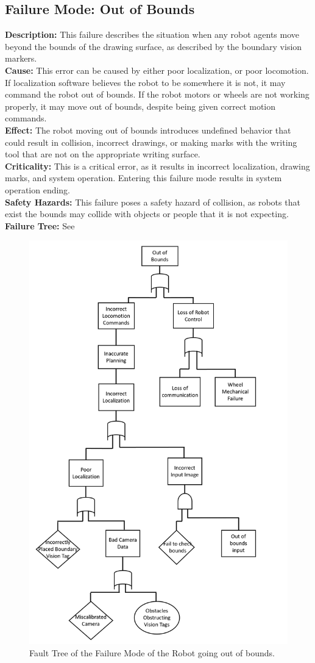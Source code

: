 \subsection{Failure Mode: Out of Bounds}
\label{sec:sys_val_fm_bounds}
\textbf{Description:} This failure describes the situation when any robot agents move beyond the bounds of the drawing surface, as described by the boundary vision markers.\\
\textbf{Cause:} This error can be caused by either poor localization, or poor locomotion. If localization software believes the robot to be somewhere it is not, it may command the robot out of bounds. If the robot motors or wheels are not working properly, it may move out of bounds, despite being given correct motion commands.\\
\textbf{Effect:} The robot moving out of bounds introduces undefined behavior that could result in collision, incorrect drawings, or making marks with the writing tool that are not on the appropriate writing surface.\\
\textbf{Criticality:} This is a critical error, as it results in incorrect localization, drawing marks, and system operation. Entering this failure mode results in system operation ending.\\
\textbf{Safety Hazards:} This failure poses a safety hazard of collision, as robots that exist the bounds may collide with objects or people that it is not expecting.\\
\textbf{Failure Tree:} See 

\begin{figure}
 \centering
 \includegraphics[width=0.65\columnwidth]{figs/fault_table_bounds.png}
 \caption{Fault Tree of the Failure Mode of the Robot going out of bounds.}
 \label{fig:out_of_bounds_failure}
\end{figure}
\clearpage

